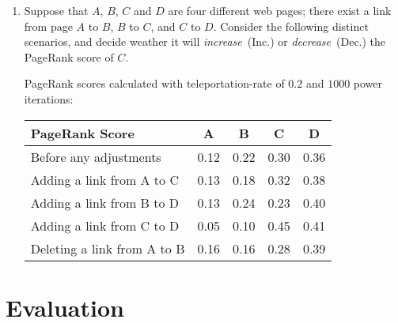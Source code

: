 \documentclass[exam, sectionseven]{acAssignment}
\begin{document}
\begin{enumerate}
    \clearpage
    \item Suppose that $A$, $B$, $C$ and $D$ are four different web pages; there exist a link from page $A$ to $B$, $B$ to $C$, and $C$ to $D$. Consider the following distinct scenarios, and decide weather it will \emph{increase}~(Inc.) or \emph{decrease}~(Dec.) the PageRank score of $C$.
        \begin{acMultipleChoice}
        \end{acMultipleChoice}

    \begin{acSolution}
        \vspace{0.25cm}
        PageRank scores calculated with teleportation-rate of $0.2$ and $1000$ power iterations:
        \begin{center}
            \begin{tabular}{lcccc}
                \toprule
                PageRank Score & A & B & C & D \\
                \midrule
                Before any adjustments      & 0.12 & 0.22 & 0.30 & 0.36 \\
                Adding a link from A to C   & 0.13 & 0.18 & 0.32 & 0.38 \\
                Adding a link from B to D   & 0.13 & 0.24 & 0.23 & 0.40 \\
                Adding a link from C to D   & 0.05 & 0.10 & 0.45 & 0.41 \\
                Deleting a link from A to B & 0.16 & 0.16 & 0.28 & 0.39 \\
                \bottomrule
            \end{tabular}
            \renewcommand*\arraystretch{1}
        \end{center}
    \end{acSolution}
\end{enumerate}


\section{Evaluation}
\end{document}
